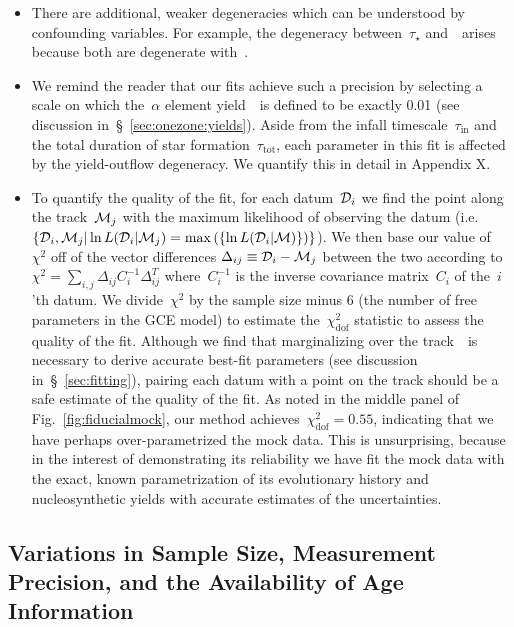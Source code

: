 \documentclass[ms.tex]{subfiles}
\begin{document}
\begin{itemize}
	\item There are additional, weaker degeneracies which can be understood
	by confounding variables.
	For example, the degeneracy between~$\tau_\star$ and~\yfeia~arises because
	both are degenerate with~\yfecc.

	\item We remind the reader that our fits achieve such a precision by
	selecting a scale on which the~$\alpha$ element yield~\yacc~is defined to
	be exactly 0.01 (see discussion in~\S~\ref{sec:onezone:yields}).
	Aside from the infall timescale~$\tau_\text{in}$ and the total duration of
	star formation~$\tau_\text{tot}$, each parameter in this fit is affected by
	the yield-outflow degeneracy.
	We quantify this in detail in Appendix X.

	\item To quantify the quality of the fit, for each datum~$\mathcal{D}_i$
	we find the point along the track~$\mathcal{M}_j$ with the maximum
	likelihood of observing the datum (i.e.~$\{\mathcal{D}_i, \mathcal{M}_j |
	\ln L(\mathcal{D}_i | \mathcal{M}_j) = \max\left(\{
	\ln L(\mathcal{D}_i | \mathcal{M})\}\right)\}$).
	We then base our value of~$\chi^2$ off of the vector differences
	$\Delta_{ij} \equiv \mathcal{D}_i - \mathcal{M}_j$ between the two according
	to $\chi^2 = \sum_{i,j} \Delta_{ij}C_i^{-1}\Delta_{ij}^T$ where~$C_i^{-1}$
	is the inverse covariance matrix~$C_i$ of the~$i$'th datum.
	We divide~$\chi^2$ by the sample size minus 6 (the number of free
	parameters in the GCE model) to estimate the~$\chi^2_\text{dof}$ statistic
	to assess the quality of the fit.
	Although we find that marginalizing over the track~~is necessary
	to derive accurate best-fit parameters (see discussion
	in~\S~\ref{sec:fitting}), pairing each datum with a point on the track
	should be a safe estimate of the quality of the fit.
	As noted in the middle panel of Fig.~\ref{fig:fiducialmock}, our method
	achieves~$\chi_\text{dof}^2 = 0.55$, indicating that we have perhaps
	over-parametrized the mock data.
	This is unsurprising, because in the interest of demonstrating its
	reliability we have fit the mock data with the exact, known parametrization
	of its evolutionary history and nucleosynthetic yields with accurate
	estimates of the uncertainties.

\end{itemize}

\subsection{Variations in Sample Size, Measurement Precision, and the
Availability of Age Information}
\label{sec:mocks:variations}
\end{document}

